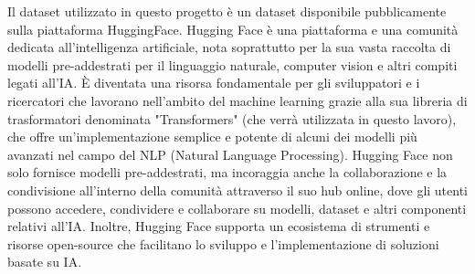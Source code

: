 \documentclass[../../Thesis.tex]{subfiles}
\begin{document}
Il dataset \cite{rossini2022slitherauditedcontracts} utilizzato in questo progetto è un dataset disponibile pubblicamente sulla piattaforma HuggingFace. Hugging Face è una piattaforma e una comunità dedicata all'intelligenza artificiale, nota soprattutto per la sua vasta raccolta di modelli pre-addestrati per il linguaggio naturale, computer vision e altri compiti legati all'IA. È diventata una risorsa fondamentale per gli sviluppatori e i ricercatori che lavorano nell'ambito del machine learning grazie alla sua libreria di trasformatori denominata "Transformers" (che verrà utilizzata in questo lavoro), che offre un'implementazione semplice e potente di alcuni dei modelli più avanzati nel campo del NLP (Natural Language Processing). Hugging Face non solo fornisce modelli pre-addestrati, ma incoraggia anche la collaborazione e la condivisione all'interno della comunità attraverso il suo hub online, dove gli utenti possono accedere, condividere e collaborare su modelli, dataset e altri componenti relativi all'IA. Inoltre, Hugging Face supporta un ecosistema di strumenti e risorse open-source che facilitano lo sviluppo e l'implementazione di soluzioni basate su IA.
\end{document}
